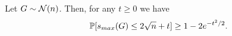 \documentclass[10pt]{book}
\begin{document}
\begin{thm}
\label{rmt_smax_concen}
Let $G\sim\mathcal{N}(n)$. Then, for any $t\ge 0$ we have
\[
\mathbb{P}[s_{max}(G)\le 2\sqrt{n}+t]\ge 1-2e^{-t^2/2}.
\]
\end{thm}
\pfsk{\ref{rmt_smax_concen}}{
    
}






\end{document}
